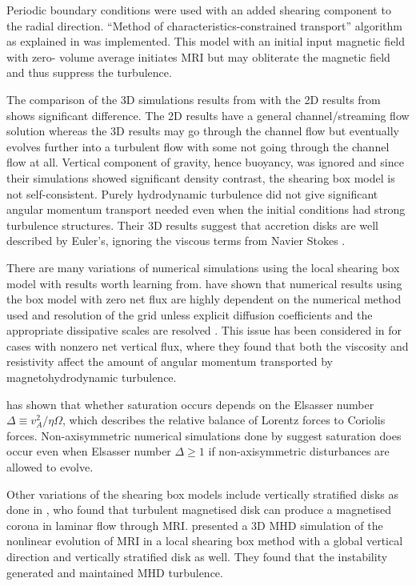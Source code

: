 \documentclass{jfm}
\begin{document}
Periodic boundary conditions were used with an added shearing component to the
radial direction. ``Method of characteristics-constrained transport'' algorithm
as explained in \cite{Hawley1995} was implemented. This model with an initial
input magnetic field with zero- volume average initiates MRI but may obliterate
the magnetic field and thus suppress the turbulence. 

The comparison of the 3D simulations results from \cite{Hawley1995} with the 2D
results from \cite{Balbus1994} shows significant difference. The 2D results
have a general channel/streaming flow solution whereas the 3D results may go
through the channel flow but eventually evolves further into a turbulent flow
with some not going through the channel flow at all. Vertical component of
gravity, hence buoyancy, was ignored and since their simulations showed
significant density contrast, the shearing box model is not self-consistent.
Purely hydrodynamic turbulence did not give significant angular momentum
transport needed even when the initial conditions had strong turbulence
structures. Their 3D results suggest that accretion disks are well described by
Euler's, ignoring the viscous terms from Navier Stokes \cite{Hawley1995}.

There are many variations of numerical simulations using the local shearing box
model with results worth learning from.  \citep{Fromang&Papaloizou2007,
    Fromang2007} have shown that numerical results using the box model with
zero net flux are highly dependent on the numerical method used and resolution
of the grid unless explicit diffusion coefficients and the appropriate
dissipative scales are resolved . This issue has been considered in
\cite{Lesur2007} for cases with nonzero net vertical flux, where they found
that both the viscosity and resistivity affect the amount of angular momentum
transported by magnetohydrodynamic turbulence. 

\cite{Sano1998} has shown that whether saturation occurs depends on the
Elsasser number $\Delta \equiv v^2_A/\eta \Omega$, which describes the relative
balance of Lorentz forces to Coriolis forces. Non-axisymmetric numerical
simulations done by \cite{Fleming2000} suggest saturation does occur even when
Elsasser number $  \Delta \ge 1$ if non-axisymmetric disturbances are allowed
to evolve. 

Other variations of the shearing box models include vertically stratified disks
as done in \cite{Miller1999}, who found that turbulent magnetised disk can
produce a magnetised corona in laminar flow through MRI. \cite{Stone1996}
presented a 3D MHD simulation of the nonlinear evolution of MRI in a local
shearing box method with a global vertical direction and vertically stratified
disk as well. They found that the instability generated and maintained MHD
turbulence.
\end{document}
